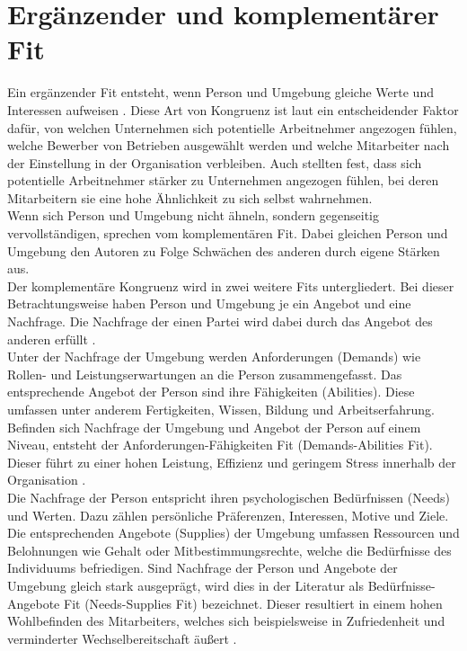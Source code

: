 \section{Ergänzender und komplementärer Fit}
\label{ch:personEnvironmentFit:supplementaryUndComplementary}
Ein ergänzender Fit entsteht, wenn Person und Umgebung gleiche Werte und Interessen aufweisen \cite[S. 2f.]{muchinsky:1987}. Diese Art von Kongruenz ist laut \textcite[S. 1ff.]{schneider:1987} ein entscheidender Faktor dafür, von welchen Unternehmen sich potentielle Arbeitnehmer angezogen fühlen, welche Bewerber von Betrieben ausgewählt werden und welche Mitarbeiter nach der Einstellung in der Organisation verbleiben. Auch \textcite[S. 7]{devendorf:2008} stellten fest, dass sich potentielle Arbeitnehmer stärker zu Unternehmen angezogen fühlen, bei deren Mitarbeitern sie eine hohe Ähnlichkeit zu sich selbst wahrnehmen.\\
Wenn sich Person und Umgebung nicht ähneln, sondern gegenseitig vervollständigen, sprechen \textcite[S. 4]{muchinsky:1987} vom komplementären Fit. Dabei gleichen Person und Umgebung den Autoren zu Folge Schwächen des anderen durch eigene Stärken aus.\\
Der komplementäre Kongruenz wird in zwei weitere Fits untergliedert. Bei dieser Betrachtungsweise haben Person und Umgebung je ein Angebot und eine Nachfrage. Die Nachfrage der einen Partei wird dabei durch das Angebot des anderen erfüllt \cite[S. 2ff.]{caplan:1987}\cite[S. 2f.]{edwards:1991}.\\
Unter der Nachfrage der Umgebung werden Anforderungen (Demands) wie Rollen- und Leistungserwartungen an die Person zusammengefasst. Das entsprechende Angebot der Person sind ihre Fähigkeiten (Abilities). Diese umfassen unter anderem Fertigkeiten, Wissen, Bildung und Arbeitserfahrung. Befinden sich Nachfrage der Umgebung und Angebot der Person auf einem Niveau, entsteht der Anforderungen-Fähigkeiten Fit (Demands-Abilities Fit). Dieser führt zu einer hohen Leistung, Effizienz und geringem Stress innerhalb der Organisation \cite[S. 3f.]{edwards:1991}\cite[S. 5]{edwards:1996}\cite[S. 4f.]{edwards:2007}\cite[S. 6]{su:2015}.\\
Die Nachfrage der Person entspricht ihren psychologischen Bedürfnissen (Needs) und Werten. Dazu zählen persönliche Präferenzen, Interessen, Motive und Ziele. Die entsprechenden Angebote (Supplies) der Umgebung umfassen Ressourcen und Belohnungen wie Gehalt oder Mitbestimmungsrechte, welche die Bedürfnisse des Individuums befriedigen. Sind Nachfrage der Person und Angebote der Umgebung gleich stark ausgeprägt, wird dies in der Literatur als Bedürfnisse-Angebote Fit (Needs-Supplies Fit) bezeichnet. Dieser resultiert in einem hohen Wohlbefinden des Mitarbeiters, welches sich beispielsweise in Zufriedenheit und verminderter Wechselbereitschaft äußert \cite[S. 2]{edwards:2004}\cite[S. 2f.]{edwards:1996}\cite[S. 4]{edwards:2008}\cite[S. 4f.]{edwards:2007}\cite[S. 6]{su:2015}.\\
